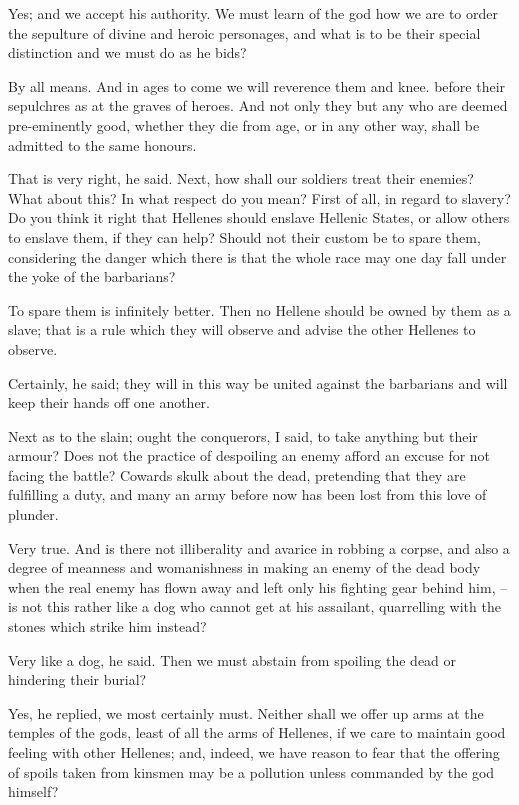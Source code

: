 Yes; and we accept his authority.
We must learn of the god how we are to order the sepulture of divine and heroic personages, and what is to be their special distinction and we must do as he bids?

By all means.
And in ages to come we will reverence them and knee. before their sepulchres as at the graves of heroes. And not only they but any who are deemed pre-eminently good, whether they die from age, or in any other way, shall be admitted to the same honours.

That is very right, he said.
Next, how shall our soldiers treat their enemies? What about this?
In what respect do you mean?
First of all, in regard to slavery? Do you think it right that Hellenes should enslave Hellenic States, or allow others to enslave them, if they can help? Should not their custom be to spare them, considering the danger which there is that the whole race may one day fall under the yoke of the barbarians?

To spare them is infinitely better.
Then no Hellene should be owned by them as a slave; that is a rule which they will observe and advise the other Hellenes to observe.

Certainly, he said; they will in this way be united against the barbarians and will keep their hands off one another.

Next as to the slain; ought the conquerors, I said, to take anything but their armour? Does not the practice of despoiling an enemy afford an excuse for not facing the battle? Cowards skulk about the dead, pretending that they are fulfilling a duty, and many an army before now has been lost from this love of plunder.

Very true.
And is there not illiberality and avarice in robbing a corpse, and also a degree of meanness and womanishness in making an enemy of the dead body when the real enemy has flown away and left only his fighting gear behind him, --is not this rather like a dog who cannot get at his assailant, quarrelling with the stones which strike him instead?

Very like a dog, he said.
Then we must abstain from spoiling the dead or hindering their burial?

Yes, he replied, we most certainly must.
Neither shall we offer up arms at the temples of the gods, least of all the arms of Hellenes, if we care to maintain good feeling with other Hellenes; and, indeed, we have reason to fear that the offering of spoils taken from kinsmen may be a pollution unless commanded by the god himself?

